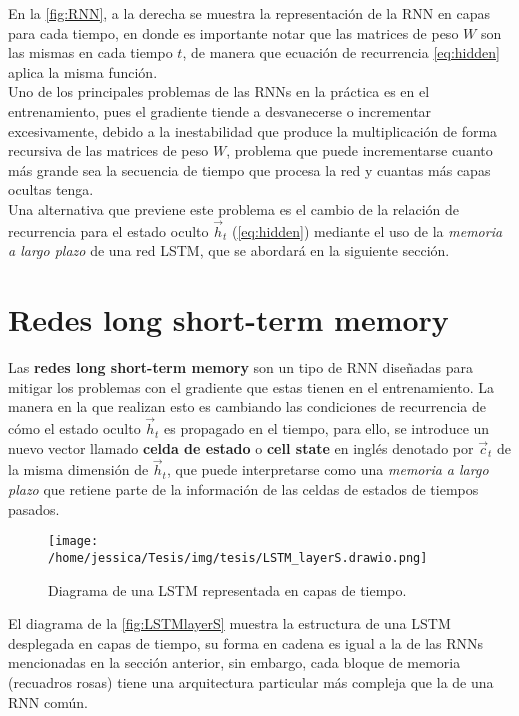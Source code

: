 En la \autoref{fig:RNN}, a la derecha se muestra la representación de la \acs{RNN} en capas para cada tiempo, en donde es importante notar que las matrices de peso $W$ son las mismas en cada tiempo $t$, de manera que ecuación de recurrencia \autoref{eq:hidden} aplica la misma función.
\\

Uno de los principales problemas de las \acs{RNN}s en la práctica es en el entrenamiento, pues el gradiente tiende a desvanecerse o incrementar excesivamente, debido a la inestabilidad que produce la multiplicación de forma recursiva de las matrices de peso $W$, problema que puede incrementarse cuanto más grande sea la secuencia de tiempo que procesa la red y cuantas más capas ocultas tenga. \cite{Nielsen:2018}
\\
Una alternativa que previene este problema es el cambio de la relación de recurrencia para el estado oculto $\vec{h}_t$ (\autoref{eq:hidden}) mediante el uso de la \emph{memoria a largo plazo} de una red \acs{LSTM}, que se abordará en la siguiente sección.

\section{Redes long short-term memory}\label{sec:lstm}

Las \textbf{redes long short-term memory} son un tipo de \acs{RNN} diseñadas para mitigar los problemas con el gradiente que estas tienen en el entrenamiento. La manera en la que realizan esto es cambiando las condiciones de recurrencia de cómo el estado oculto $\vec{h}_t$ es propagado en el tiempo, para ello, se introduce un nuevo vector llamado \textbf{celda de estado} o \textbf{cell state} en inglés denotado por $\vec{c}_{t}$ de la misma dimensión de $\vec{h}_t$, que puede interpretarse como una \emph{memoria a largo plazo} que retiene parte de la información de las celdas de estados de tiempos pasados. \cite{Nielsen:2018}

\begin{figure}[!htbp]
  \centering
  \texttt{[image: /home/jessica/Tesis/img/tesis/LSTM\_layerS.drawio.png]}
  \caption{Diagrama de una \acs{LSTM} representada en capas de tiempo.}
  \label{fig:LSTMlayerS}
\end{figure}

El diagrama de la \autoref{fig:LSTMlayerS} muestra la estructura de una \acs{LSTM} desplegada en capas de tiempo, su forma en cadena es igual a la de las \acs{RNN}s mencionadas en la sección anterior, sin embargo, cada bloque de memoria (recuadros rosas) tiene una arquitectura particular más compleja que la de una \acs{RNN} común.

